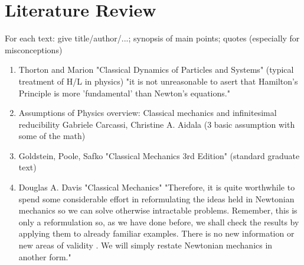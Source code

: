 \documentclass{article}
\begin{document}
\section{Literature Review}
For each text: give title/author/...; synopsis of main points; quotes (especially for misconceptions)

\begin{enumerate}
\item Thorton and Marion "Classical Dynamics of Particles and Systems"
(typical treatment of H/L in physics)
"it is not unreasonable to asert that Hamilton's Principle is more 'fundamental' than Newton's equations."
\item Assumptions of Physics overview:
Classical mechanics and infinitesimal reducibility
Gabriele Carcassi, Christine A. Aidala (3 basic assumption with some of the math)
\item Goldstein, Poole, Safko "Classical Mechanics 3rd Edition"
(standard graduate text)
\item Douglas A. Davis "Classical Mechanics"
"Therefore, it is quite worthwhile to spend some considerable effort in reformulating the ideas held in Newtonian mechanics so we can solve otherwise intractable problems. Remember, this is only a reformulation so, as we have done before, we shall check the results by applying them to already familiar examples. There is no new information or new areas of validity . We will simply restate Newtonian mechanics in another form."

\end{enumerate}
\end{document}
